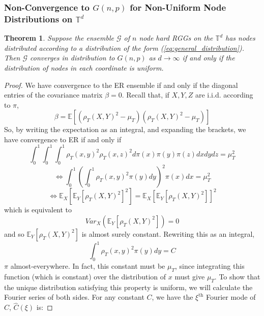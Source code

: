 \documentclass{article}
\newtheorem{theorem}{Theorem}
\newcommand{\tti}{\rightarrow\infty}
\newcommand{\graph}{\mathcal{G}}
\begin{document}
\subsubsection{Non-Convergence to $G(n,p)$ for Non-Uniform Node Distributions on $\mathbb{T}^d$}
\label{no convergence for gaussian in torus}
\begin{theorem}
\label{no convergence for gaussian in torus thm}
    Suppose the ensemble $\graph$ of $n$ node hard RGGs on the $\mathbb{T}^d$ has nodes distributed according to a distribution of the form (\ref{eq:general_distribution}). Then $\graph$ converges in distribution to $G(n,p)$ as $d\tti$ if and only if the distribution of nodes in each coordinate is uniform.
\end{theorem}
\begin{proof}
    We have convergence to the ER ensemble if and only if the diagonal entries of the covariance matrix $\beta = 0$. Recall that, if $X,Y,Z$ are i.i.d. according to $\pi$,
    \begin{equation}
        \beta = \mathbb{E}[(\rho_T(X,Y)^2-\mu_T)(\rho_T(X,Y)^2-\mu_T)]
    \end{equation}
    So, by writing the expectation as an integral, and expanding the brackets, we have convergence to ER if and only if
    \begin{equation}
            \int_0^1\int_0^1\int_0^1\rho_T(x,y)^2\rho_T(x,z)^2 d\pi(x)\pi(y)\pi(z)dxdydz = \mu_T^2
    \end{equation}
    \begin{equation}
        \iff \int_0^1\left(\int_0^1 \rho_T(x,y)^2\pi(y)dy\right)^2\pi(x)dx = \mu_T^2
    \end{equation}
    \begin{equation}
        \iff \mathbb{E}_X[\mathbb{E}_Y[\rho_T(X,Y)^2]^2] = \mathbb{E}_X[\mathbb{E}_Y[\rho_T(X,Y)^2]]^2
    \end{equation}
    which is equivalent to
    \begin{equation}
        Var_X(\mathbb{E}_Y[\rho_T(X,Y)^2]) = 0
    \end{equation}
    and so $\mathbb{E}_Y[\rho_T(X,Y)^2]$ is almost surely constant. Rewriting this as an integral,
    \begin{equation}
        \int_0^1 \rho_T(x,y)^2\pi(y)dy = C
    \end{equation}
    $\pi$ almost-everywhere. In fact, this constant must be $\mu_T$, since integrating this function (which is constant) over the distribution of $x$ must give $\mu_T$. To show that the unique distribution satisfying this property is uniform, we will calculate the Fourier series of both sides. For any constant $C$, we have the $\xi^{\text{th}}$ Fourier mode of $C$, $\hat{C}(\xi)$ is:

\end{proof}
\end{document}
